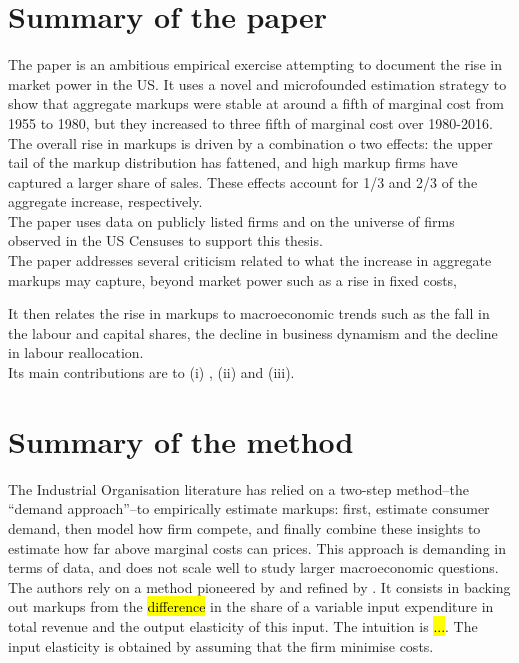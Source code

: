 \documentclass{amsart}
\theoremstyle{definition}
\theoremstyle{remark}
\numberwithin{equation}{section}
\begin{document}
\section{Summary of the paper}

The paper is an ambitious empirical exercise attempting to document the rise in market power in the US. It uses a novel and microfounded estimation strategy to show that aggregate markups were stable at around a fifth of marginal cost from 1955 to 1980, but they increased to three fifth of marginal cost over 1980-2016. The overall rise in markups is driven by a combination o two effects: the upper tail of the markup distribution has fattened, and high markup firms have captured a larger share of sales. These effects account for 1/3 and 2/3 of the aggregate increase, respectively.\\

The paper uses data on publicly listed firms and on the universe of firms observed in the US Censuses to support this thesis.\\

The paper addresses several criticism related to what the increase in aggregate markups may capture, beyond market power such as a rise in fixed costs, 

It then relates the rise in markups to macroeconomic trends such as the fall in the labour and capital shares, the decline in business dynamism and the decline in labour reallocation.\\

Its main contributions are to (i) , (ii) and (iii).

\section{Summary of the method}

The Industrial Organisation literature has relied on a two-step method--the ``demand approach''--to empirically estimate markups: first, estimate consumer demand, then model how firm compete, and finally combine these insights to estimate how far above marginal costs can prices. This approach is demanding in terms of data, and does not scale well to study larger macroeconomic questions.\\

The authors rely on a method pioneered by \cite{hall1988relation} and refined by \cite{de2012markups}. It consists in backing out markups from the \hl{difference} in the share of a variable input expenditure in total revenue and the output elasticity of this input. The intuition is \hl{...}. The input elasticity is obtained by assuming that the firm minimise costs.\\
\end{document}
